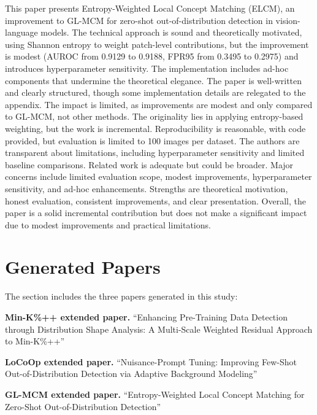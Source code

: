 \begin{tcolorbox}[
    colback=white,
    colframe=black!70,
    title=Reviewer Comments,
    breakable=true,
    fonttitle=\bfseries
]

This paper presents Entropy-Weighted Local Concept Matching (ELCM), an improvement to GL-MCM for zero-shot out-of-distribution detection in vision-language models. The technical approach is sound and theoretically motivated, using Shannon entropy to weight patch-level contributions, but the improvement is modest (AUROC from 0.9129 to 0.9188, FPR95 from 0.3495 to 0.2975) and introduces hyperparameter sensitivity. The implementation includes ad-hoc components that undermine the theoretical elegance. The paper is well-written and clearly structured, though some implementation details are relegated to the appendix. The impact is limited, as improvements are modest and only compared to GL-MCM, not other methods. The originality lies in applying entropy-based weighting, but the work is incremental. Reproducibility is reasonable, with code provided, but evaluation is limited to 100 images per dataset. The authors are transparent about limitations, including hyperparameter sensitivity and limited baseline comparisons. Related work is adequate but could be broader. Major concerns include limited evaluation scope, modest improvements, hyperparameter sensitivity, and ad-hoc enhancements. Strengths are theoretical motivation, honest evaluation, consistent improvements, and clear presentation. Overall, the paper is a solid incremental contribution but does not make a significant impact due to modest improvements and practical limitations.

\end{tcolorbox}



\section{Generated Papers}
The section includes the three papers generated in this study:

\textbf{Min-K\%++ extended paper.} 
``Enhancing Pre-Training Data Detection through
Distribution Shape Analysis: A Multi-Scale Weighted
Residual Approach to Min-K\%++''

\textbf{LoCoOp extended paper.} 
``Nuisance-Prompt Tuning: Improving Few-Shot
Out-of-Distribution Detection via Adaptive
Background Modeling''

\textbf{GL-MCM extended paper.}
``Entropy-Weighted Local Concept Matching for
Zero-Shot Out-of-Distribution Detection''






\let\clearpage\relax